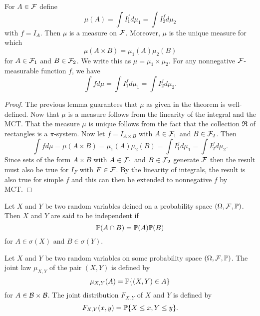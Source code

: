 \begin{theorem}
For $A\in\mathcal F$ define
\begin{equation*}
\mu(A)=\int I_1^f d\mu_1=\int I_2^f d\mu_2
\end{equation*}
with $f=I_A$. Then $\mu$ is a measure on $\mathcal F$. Moreover, $\mu$ is the unique measure
for which
\begin{equation*}
\mu(A\times B)=\mu_1(A)\mu_2(B)
\end{equation*}
for $A\in \mathcal F_1$ and $B\in \mathcal F_2$. We write this as $\mu=\mu_1\times \mu_2$. For any 
nonnegative $\mathcal F$-measurable function $f$, we have
\begin{equation*}
\int fd\mu = \int I_1^f d\mu_1 = \int I_2^f d\mu_2.
\end{equation*}
\end{theorem}





\begin{proof}
The previous lemma guarantees that $\mu$ as given in the theorem is well-defined. Now that $\mu$ is a measure follows from the linearity of the integral and the MCT. That the measure $\mu$ is unique follows from the fact that the collection $\Re$ of rectangles is a $\pi$-system. Now let $f=I_{A\times B}$ with $A\in\mathcal F_1$ and $B\in\mathcal F_2$. Then
\begin{equation*}
\int fd\mu=\mu(A\times B)=\mu_1(A)\mu_2(B)=\int I_1^f d\mu_1=\int I_2^fd\mu_2.
\end{equation*}
Since sets of the form $A\times B$ with $A\in\mathcal F_1$ and $B\in\mathcal F_2$ generate $\mathcal F$ then the result must also be true for $I_F$ with $F\in\mathcal F$. By the linearity of integrals, the result is also true for simple $f$ and this can then be extended to nonnegative $f$ by MCT.
\end{proof}





\begin{definition}[Independence]
Let $X$ and $Y$ be two random variables deined on a probability space $(\Omega, \mathcal F, \mathbb{P})$. Then $X$ and $Y$ are said to be independent if
\begin{equation*}
\mathbb P(A\cap B)=\mathbb P(A)\mathbb P(B)
\end{equation*}
for $A\in\sigma(X)$ and $B\in\sigma(Y)$.
\end{definition}



\begin{definition}
Let $X$ and $Y$ be two random variables on some probability space $(\Omega, \mathcal F, \mathbb P)$. The joint law $\mu_{X,Y}$ of the pair $(X,Y)$ is defined by
\begin{equation*}
\mu_{X,Y}(A)=\mathbb P\{(X,Y)\in A \}
\end{equation*}
for $A\in\mathcal B\times\mathcal B$. The joint distribution $F_{X,Y}$ of $X$ and $Y$ is defined by
\begin{equation*}
F_{X,Y}(x,y)=\mathbb P\{X\leq x, Y\leq y \}.
\end{equation*}
\end{definition}




